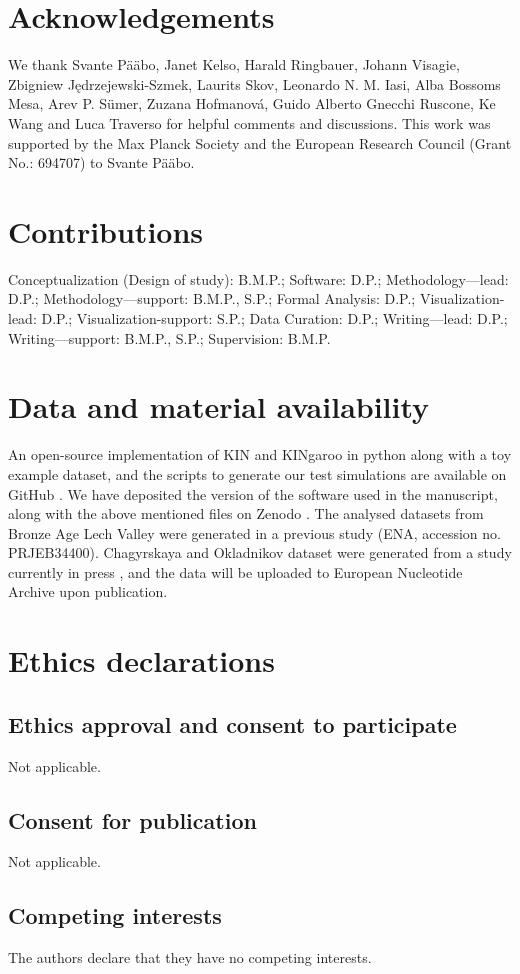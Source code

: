 \documentclass[12pt, letterpaper]{article}
\begin{document}
\section{Acknowledgements}
We thank Svante Pääbo, Janet Kelso, Harald Ringbauer, Johann Visagie, Zbigniew Jędrzejewski-Szmek, Laurits Skov, Leonardo N. M. Iasi, Alba Bossoms Mesa, Arev P. Sümer, Zuzana Hofmanová, Guido Alberto Gnecchi Ruscone, Ke Wang and Luca Traverso for helpful comments and discussions. This work was supported by the Max Planck Society and the European Research Council (Grant No.: 694707) to Svante Pääbo.

\section{Contributions}
Conceptualization (Design of study): B.M.P.; Software: D.P.; Methodology—lead: D.P.; Methodology—support: B.M.P., S.P.; Formal Analysis: D.P.; Visualization-lead: D.P.; Visualization-support: S.P.; Data Curation: D.P.; Writing—lead: D.P.; Writing—support: B.M.P., S.P.; Supervision: B.M.P.

\section{Data and material availability}
An open-source implementation of KIN and KINgaroo in python along with a toy example dataset, and the scripts to generate our test simulations are available on GitHub \cite{divyaratan_popli_httpsgithubcomdivyaratanpoplikinship_inferencereleasestagv312_2022}. We have deposited the version of the software used in the manuscript, along with the above mentioned files on Zenodo \cite{divyaratan_popli_httpsdoiorg105281zenodo6561015_nodate}. The analysed datasets from Bronze Age Lech Valley were generated in a previous study (ENA, accession no. PRJEB34400). Chagyrskaya and Okladnikov dataset were generated from a study currently in press \cite{laurits_skov_genetic_nodate}, and the data will be uploaded to European Nucleotide Archive upon publication. 

\section{Ethics declarations}
\subsection{Ethics approval and consent to participate}
Not applicable.

\subsection{Consent for publication}
Not applicable.

\subsection{Competing interests}
The authors declare that they have no competing interests.




\end{document}
